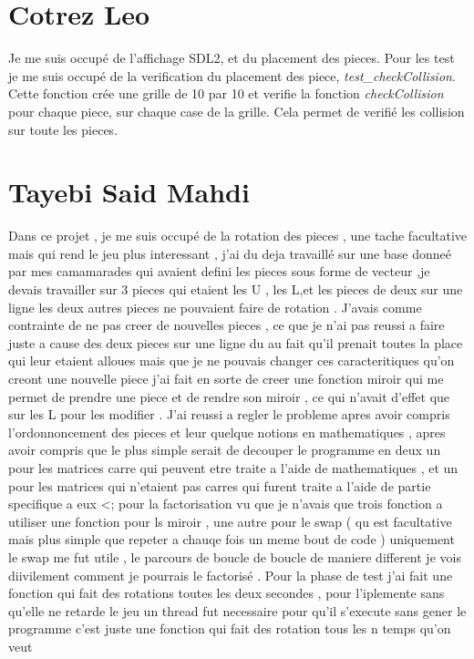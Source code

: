 \documentclass[11pt]{article}
\begin{document}
\section{Cotrez Leo}

Je me suis occupé de l'affichage SDL2, et du placement des pieces. Pour les test je me suis occupé de la verification du placement des piece, \emph{test\_checkCollision}. Cette fonction crée une grille de 10 par 10 et verifie la fonction \emph{checkCollision} pour chaque piece, sur chaque case de la grille. Cela permet de verifié les collision sur toute les pieces.

\section{Tayebi Said Mahdi}
Dans ce projet , je me suis occupé de la rotation des pieces , une tache facultative mais qui rend le jeu plus interessant , j'ai du deja travaillé sur une base donneé par mes camamarades qui avaient defini les pieces sous forme de vecteur ,je devais travailler sur 3 pieces qui etaient les U , les L,et les pieces de deux sur une ligne les deux autres pieces ne pouvaient faire de rotation .
\newline J'avais comme contrainte de ne pas creer de nouvelles pieces , ce que je n'ai pas reussi a faire juste a cause des deux pieces sur une ligne du au fait qu'il prenait toutes la place qui leur etaient alloues mais que je ne pouvais changer ces caracteritiques qu'on creont une nouvelle piece
  j'ai fait en sorte de creer une fonction miroir qui me permet de prendre une piece et de rendre son miroir , ce qui n'avait d'effet que sur les L pour les modifier .
J'ai reussi a regler le probleme apres avoir compris l'ordonnoncement des pieces et leur quelque notions en mathematiques , apres avoir compris que le plus simple serait de decouper le programme en deux un pour les matrices carre qui peuvent etre traite a l'aide de mathematiques , et un pour les matrices qui n'etaient pas carres qui furent traite a l'aide de partie specifique a eux <;
pour la factorisation  vu que je n'avais que trois fonction a utiliser une fonction pour ls miroir , une autre pour le swap ( qu est facultative mais plus simple que repeter a chauqe fois un meme bout de code ) uniquement le  swap me fut utile , le parcours de boucle de boucle de maniere different je vois diivilement comment je pourrais le factorisé .
 Pour la phase de test j'ai fait une fonction qui fait des rotations toutes les deux secondes , pour l'iplemente sans qu'elle ne retarde le jeu un thread fut necessaire pour qu'il s'execute sans gener le programme c'est juste une fonction qui fait des rotation tous les n temps qu'on veut
\end{document}

